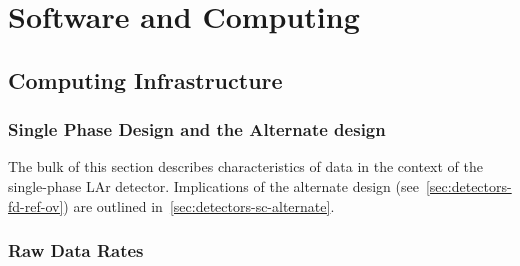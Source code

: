 \chapter{Software and Computing}
\label{ch:detectors-sc}

\section{Computing Infrastructure}
\label{sec:detectors-sc-infrastructure}

\subsection{Single Phase Design and the Alternate design}
The bulk of this section describes characteristics of data in the context of
the single-phase LAr detector. Implications of the alternate design (see~\ref{sec:detectors-fd-ref-ov})
are outlined in~\ref{sec:detectors-sc-alternate}.

\subsection{Raw Data Rates}
\label{sec:detectors-sc-infrastructure-data-rates}


